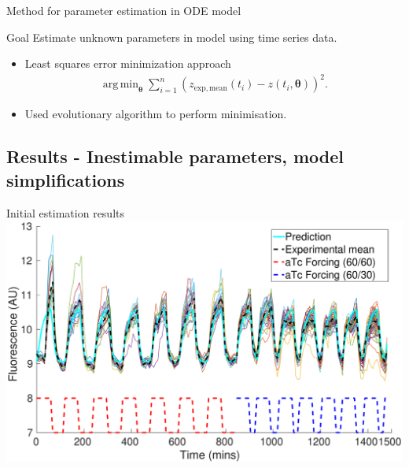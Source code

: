 \documentclass{beamer}
\DeclareMathOperator*{\argmin}{arg\,min}
\begin{document}
\begin{frame}{Method for parameter estimation in ODE model}
  \begin{block}{Goal}
 Estimate unknown parameters in model using time series data.
    \end{block}
    
      \begin{itemize}
    \item  Least squares error minimization approach
    \begin{align*}
\argmin_{\boldsymbol{\theta}} \sum_{i =1}^{n} (z_{\mathrm{exp, mean}}(t_{i}) - z(t_{i},\boldsymbol{\theta}))^2.
\end{align*}
\item Used evolutionary algorithm to perform minimisation.
    \end{itemize}
\end{frame}

\subsection{Results - Inestimable parameters, model simplifications}

\begin{frame}{Initial estimation results}
  \includegraphics[scale = 0.28, clip = true, trim = 80 0 0 0]{Figures/13_9_bestPlot}
\end{frame}
\end{document}
